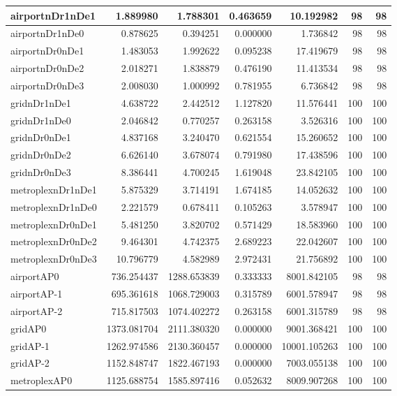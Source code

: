 \documentclass[../../../thesis.tex]{subfiles}
\begin{document}
\begin{longtable}{|l|r|r|r|r|r|r|}
\endlastfoot
airportnDr1nDe1 & 1.889980 & 1.788301 & 0.463659 & 10.192982 & 98 & 98 \\ \hline
airportnDr1nDe0 & 0.878625 & 0.394251 & 0.000000 & 1.736842 & 98 & 98 \\ \hline
airportnDr0nDe1 & 1.483053 & 1.992622 & 0.095238 & 17.419679 & 98 & 98 \\ \hline
airportnDr0nDe2 & 2.018271 & 1.838879 & 0.476190 & 11.413534 & 98 & 98 \\ \hline
airportnDr0nDe3 & 2.008030 & 1.000992 & 0.781955 & 6.736842 & 98 & 98 \\ \hline
gridnDr1nDe1 & 4.638722 & 2.442512 & 1.127820 & 11.576441 & 100 & 100 \\ \hline
gridnDr1nDe0 & 2.046842 & 0.770257 & 0.263158 & 3.526316 & 100 & 100 \\ \hline
gridnDr0nDe1 & 4.837168 & 3.240470 & 0.621554 & 15.260652 & 100 & 100 \\ \hline
gridnDr0nDe2 & 6.626140 & 3.678074 & 0.791980 & 17.438596 & 100 & 100 \\ \hline
gridnDr0nDe3 & 8.386441 & 4.700245 & 1.619048 & 23.842105 & 100 & 100 \\ \hline
metroplexnDr1nDe1 & 5.875329 & 3.714191 & 1.674185 & 14.052632 & 100 & 100 \\ \hline
metroplexnDr1nDe0 & 2.221579 & 0.678411 & 0.105263 & 3.578947 & 100 & 100 \\ \hline
metroplexnDr0nDe1 & 5.481250 & 3.820702 & 0.571429 & 18.583960 & 100 & 100 \\ \hline
metroplexnDr0nDe2 & 9.464301 & 4.742375 & 2.689223 & 22.042607 & 100 & 100 \\ \hline
metroplexnDr0nDe3 & 10.796779 & 4.582989 & 2.972431 & 21.756892 & 100 & 100 \\ \hline
airportAP0 & 736.254437 & 1288.653839 & 0.333333 & 8001.842105 & 98 & 98 \\ \hline
airportAP-1 & 695.361618 & 1068.729003 & 0.315789 & 6001.578947 & 98 & 98 \\ \hline
airportAP-2 & 715.817503 & 1074.402272 & 0.263158 & 6001.315789 & 98 & 98 \\ \hline
gridAP0 & 1373.081704 & 2111.380320 & 0.000000 & 9001.368421 & 100 & 100 \\ \hline
gridAP-1 & 1262.974586 & 2130.360457 & 0.000000 & 10001.105263 & 100 & 100 \\ \hline
gridAP-2 & 1152.848747 & 1822.467193 & 0.000000 & 7003.055138 & 100 & 100 \\ \hline
metroplexAP0 & 1125.688754 & 1585.897416 & 0.052632 & 8009.907268 & 100 & 100 \\ \hline

\end{longtable}
\end{document}
